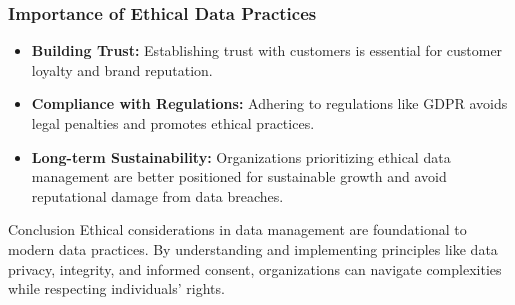 \documentclass[aspectratio=169]{beamer}
\begin{document}
\begin{frame}[fragile]
    \frametitle{Importance of Ethical Data Practices}
    \begin{itemize}
        \item \textbf{Building Trust:} Establishing trust with customers is essential for customer loyalty and brand reputation.
        \item \textbf{Compliance with Regulations:} Adhering to regulations like GDPR avoids legal penalties and promotes ethical practices.
        \item \textbf{Long-term Sustainability:} Organizations prioritizing ethical data management are better positioned for sustainable growth and avoid reputational damage from data breaches.
    \end{itemize}

    \begin{block}{Conclusion}
        Ethical considerations in data management are foundational to modern data practices. By understanding and implementing principles like data privacy, integrity, and informed consent, organizations can navigate complexities while respecting individuals' rights.
    \end{block}
\end{frame}
\end{document}
